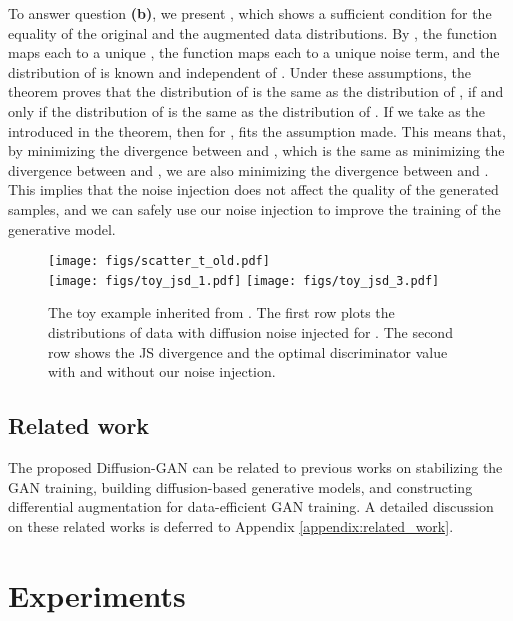 \documentclass{article} \usepackage{iclr2023_conference,times}
\theoremstyle{plain}
\theoremstyle{definition}
\theoremstyle{remark}
\begin{document}
To answer question \textbf{(b)}, we present , which shows a sufficient condition for the equality of the original and the augmented data distributions. 
{By , the function  maps each  to a unique , the function  maps each  to a unique noise term, and the distribution of  is known and independent of .} Under these assumptions, the theorem proves that the distribution of  is the same as the distribution of , if and only if the distribution of  is the same as the distribution of . {If we take  as the  introduced in the theorem, then for ,  fits the assumption made.} This means that, by minimizing the divergence between  and , which is the same as minimizing the divergence between  and , we are also minimizing the divergence between  and . This implies that the noise injection does not affect the quality of the generated samples, and we can safely use {our noise injection} to improve the training of the generative model.





\begin{figure}[!t]
    \centering
    \texttt{[image: figs/scatter\_t\_old.pdf]}\\
    \texttt{[image: figs/toy\_jsd\_1.pdf]}
    \texttt{[image: figs/toy\_jsd\_3.pdf]} 
    \vspace{-2mm}
    \caption{The toy example inherited from \citet{arjovsky2017wasserstein}. The first row plots the distributions of data with diffusion noise injected for . The second row shows the JS divergence and the optimal discriminator value with and without our noise injection. }
    \label{fig:wgan_example}
    \vspace{-2mm}
\end{figure}

\subsection{Related work}\label{sec:related_work}
The proposed Diffusion-GAN can be related to previous works on stabilizing the GAN training, building diffusion-based generative models, and constructing differential augmentation for data-efficient GAN training. A detailed discussion on these related works is deferred to Appendix \ref{appendix:related_work}.


\section{Experiments} \label{sec:experiment}
\end{document}
